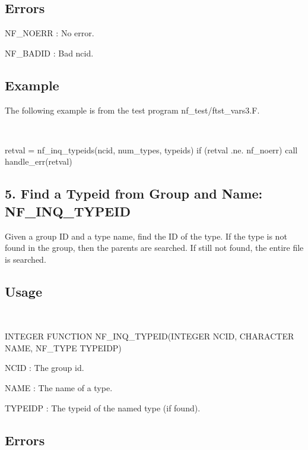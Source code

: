 \subsection*{Errors }

{\ttfamily N\+F\+\_\+\+N\+O\+E\+RR} \+: No error.

{\ttfamily N\+F\+\_\+\+B\+A\+D\+ID} \+: Bad ncid.

\subsection*{Example }

The following example is from the test program nf\+\_\+test/ftst\+\_\+vars3.\+F.

 

\begin{DoxyVerb}  retval = nf_inq_typeids(ncid, num_types, typeids)
  if (retval .ne. nf_noerr) call handle_err(retval)
\end{DoxyVerb}
\hypertarget{nc_f77_interface_guide_f77_NF-INQ-TYPEID}{}\subsection{5. Find a Typeid from Group and Name\+: N\+F\+\_\+\+I\+N\+Q\+\_\+\+T\+Y\+P\+E\+I\+D }\label{nc_f77_interface_guide_f77_NF-INQ-TYPEID}
Given a group ID and a type name, find the ID of the type. If the type is not found in the group, then the parents are searched. If still not found, the entire file is searched.

\subsection*{Usage }

 

I\+N\+T\+E\+G\+ER F\+U\+N\+C\+T\+I\+ON N\+F\+\_\+\+I\+N\+Q\+\_\+\+T\+Y\+P\+E\+I\+D(\+I\+N\+T\+E\+G\+E\+R N\+C\+I\+D, C\+H\+A\+R\+A\+C\+T\+E\+R N\+A\+M\+E, N\+F\+\_\+\+T\+Y\+P\+E T\+Y\+P\+E\+I\+D\+P)

{\ttfamily N\+C\+ID} \+: The group id.

{\ttfamily N\+A\+ME} \+: The name of a type.

{\ttfamily T\+Y\+P\+E\+I\+DP} \+: The typeid of the named type (if found).

\subsection*{Errors }

